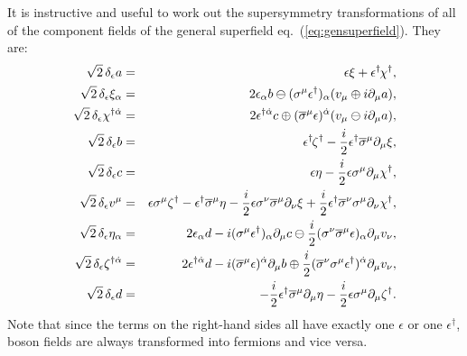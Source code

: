 \documentclass[12pt]{article}
\def\BDplus{+}
\def\BDminus{-}
\def\BDplus{-}
\def\BDminus{+}
\def\BDplus{\oplus}
\def\BDminus{\ominus}
\def\BDplus{\ominus}
\def\BDminus{\oplus}
\def\beq{\begin{eqnarray}}
\def\eeq{\end{eqnarray}}
\def\sigmabar{\overline\sigma}
\begin{document}
It is instructive and useful to work out the supersymmetry 
transformations of all of the component fields of the general superfield 
eq.~(\ref{eq:gensuperfield}). They are:
\beq
\sqrt{2}\,
\delta_\epsilon a &=& \epsilon \xi 
+ \epsilon^\dagger\hspace{-1pt}\chi^\dagger ,
\label{eq:gensuperfieldtransa}
\\
\sqrt{2}\,
\delta_\epsilon \xi_{\alpha} &=& 2 \epsilon_\alpha b 
  \BDplus (\sigma^\mu \epsilon^\dagger)_\alpha (v_\mu \BDminus i \partial_\mu a)
,
\\
\sqrt{2}\,
\delta_\epsilon \chi^{\dagger{\dot\alpha}} &=& 
  2 \epsilon^{\dagger{\dot\alpha}} c 
  \BDminus (\sigmabar^\mu \epsilon)^{\dot \alpha} (v_\mu \BDplus i \partial_\mu a)
,
\\
\sqrt{2}\,
\delta_\epsilon b &=& \epsilon^\dagger\hspace{-1pt} \zeta^\dagger 
- \frac{i}{2} \epsilon^\dagger 
\sigmabar^\mu \partial_\mu \xi
,
\\
\sqrt{2}\,
\delta_\epsilon c &=& \epsilon \eta - \frac{i}{2} \epsilon 
\sigma^\mu \partial_\mu \chi^\dagger
,
\\
\sqrt{2}\,
\delta_\epsilon v^\mu &=& 
\epsilon \sigma^\mu \zeta^\dagger 
-\epsilon^\dagger \sigmabar^\mu \eta
-\frac{i}{2} \epsilon \sigma^\nu \sigmabar^\mu \partial_\nu \xi
+\frac{i}{2} \epsilon^\dagger \sigmabar^\nu \sigma^\mu \partial_\nu \chi^\dagger
,
\\
\sqrt{2}\,
\delta_\epsilon \eta_{\alpha} &=& 2 \epsilon_\alpha d 
- i (\sigma^\mu \epsilon^\dagger)_\alpha \partial_\mu c 
\BDplus \frac{i}{2} (\sigma^\nu \sigmabar^\mu \epsilon)_\alpha \partial_\mu v_\nu
,
\\
\sqrt{2}\,
\delta_\epsilon \zeta^{\dagger{\dot\alpha}} &=& 
2 \epsilon^{\dagger{\dot \alpha}} d 
- i (\sigmabar^\mu \epsilon)^{\dot\alpha} \partial_\mu b 
\BDminus \frac{i}{2} (\sigmabar^\nu \sigma^\mu \epsilon^\dagger )^{\dot \alpha} 
\partial_\mu v_\nu 
,
\\
\sqrt{2}\,
\delta_\epsilon d &=& 
-\frac{i}{2}
\epsilon^\dagger \sigmabar^\mu \partial_\mu \eta
-\frac{i}{2}
\epsilon \sigma^\mu \partial_\mu \zeta^\dagger .
\label{eq:gensuperfieldtransd}
\eeq
Note that since the terms on the right-hand sides all have exactly one $\epsilon$
or one $\epsilon^\dagger$, 
boson fields are always transformed into fermions and vice versa.
\end{document}

